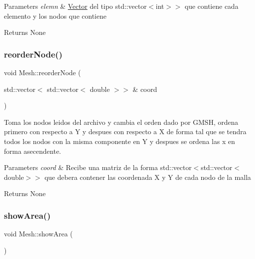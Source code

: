 \begin{DoxyParams}{Parameters}
{\em elemn} & \hyperlink{class_vector}{Vector} del tipo std\+::vector$<$int$>$$>$ que contiene cada elemento y los nodos que contiene \\
\hline
\end{DoxyParams}
\begin{DoxyReturn}{Returns}
None 
\end{DoxyReturn}
\hypertarget{class_mesh_a1a49aea1d3aa8ccf4f8acd367906b4ab}{}\label{class_mesh_a1a49aea1d3aa8ccf4f8acd367906b4ab} 
\subsubsection{\texorpdfstring{reorder\+Node()}{reorderNode()}}
{\footnotesize\ttfamily void Mesh\+::reorder\+Node (\begin{DoxyParamCaption}\item[{std\+::vector$<$ std\+::vector$<$ double $>$$>$ \&}]{coord }\end{DoxyParamCaption})}



Toma los nodos leidos del archivo y cambia el orden dado por G\+M\+SH, ordena primero con respecto a Y y despues con respecto a X de forma tal que se tendra todos los nodos con la misma componente en Y y despues se ordena las x en forma asecendente. 


\begin{DoxyParams}{Parameters}
{\em coord} & Recibe una matriz de la forma std\+::vector$<$std\+::vector$<$double$>$$>$ que debera contener las coordenada X y Y de cada nodo de la malla \\
\hline
\end{DoxyParams}
\begin{DoxyReturn}{Returns}
None 
\end{DoxyReturn}
\hypertarget{class_mesh_a759b0e82f01de4d168b2a30e5280df3c}{}\label{class_mesh_a759b0e82f01de4d168b2a30e5280df3c} 
\subsubsection{\texorpdfstring{show\+Area()}{showArea()}}
{\footnotesize\ttfamily void Mesh\+::show\+Area (\begin{DoxyParamCaption}{ }\end{DoxyParamCaption})}



